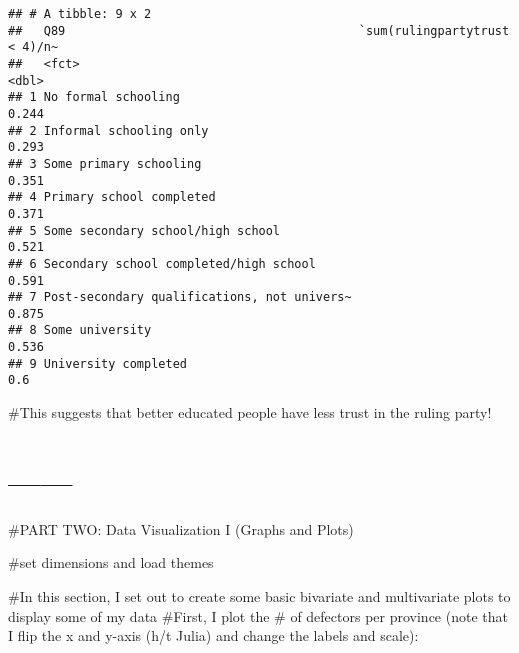\documentclass[]{article}
\newenvironment{Shaded}{\begin{snugshade}}{\end{snugshade}}
\newcommand{\DataTypeTok}[1]{\textcolor[rgb]{0.13,0.29,0.53}{#1}}
\newcommand{\DecValTok}[1]{\textcolor[rgb]{0.00,0.00,0.81}{#1}}
\newcommand{\KeywordTok}[1]{\textcolor[rgb]{0.13,0.29,0.53}{\textbf{#1}}}
\newcommand{\NormalTok}[1]{#1}
\newcommand{\OperatorTok}[1]{\textcolor[rgb]{0.81,0.36,0.00}{\textbf{#1}}}
\newcommand{\StringTok}[1]{\textcolor[rgb]{0.31,0.60,0.02}{#1}}
\begin{document}
\begin{verbatim}
## # A tibble: 9 x 2
##   Q89                                         `sum(rulingpartytrust < 4)/n~
##   <fct>                                                               <dbl>
## 1 No formal schooling                                                 0.244
## 2 Informal schooling only                                             0.293
## 3 Some primary schooling                                              0.351
## 4 Primary school completed                                            0.371
## 5 Some secondary school/high school                                   0.521
## 6 Secondary school completed/high school                              0.591
## 7 Post-secondary qualifications, not univers~                         0.875
## 8 Some university                                                     0.536
## 9 University completed                                                0.6
\end{verbatim}

\#This suggests that better educated people have less trust in the
ruling party!

\hypertarget{section-2}{%
\section{------}\label{section-2}}

\#PART TWO: Data Visualization I (Graphs and Plots)

\#set dimensions and load themes

\begin{Shaded}
\end{Shaded}

\#In this section, I set out to create some basic bivariate and
multivariate plots to display some of my data \#First, I plot the \# of
defectors per province (note that I flip the x and y-axis (h/t Julia)
and change the labels and scale):
\end{document}
